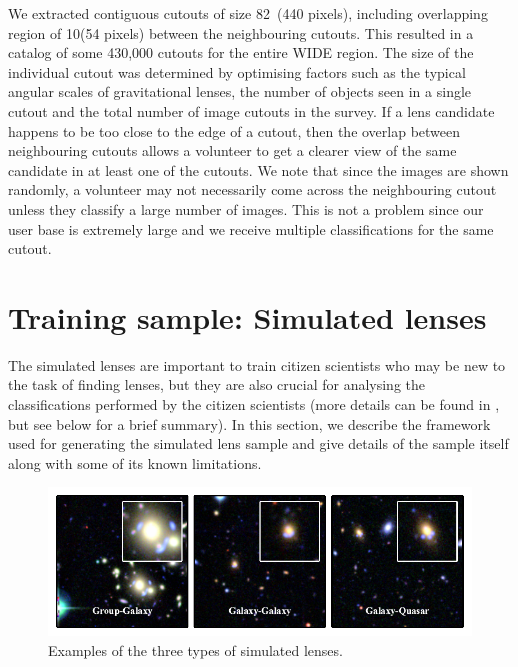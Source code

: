 \documentclass[useAMS,usenatbib,a4paper]{mn2e}
\begin{document}
We extracted contiguous cutouts of size 82\arcsec\ (440 pixels), including
overlapping region of 10\arcsec (54 pixels) between the neighbouring
cutouts. This resulted in a catalog of some 430,000 cutouts for the entire \cfhtls
WIDE region. The size of the individual cutout was determined by
optimising factors such as the typical angular scales of gravitational
lenses, the number of objects seen in a single cutout and the total
number of image cutouts in the survey. If a lens
candidate happens to be too close to the edge of a cutout, then the overlap
between neighbouring cutouts allows a volunteer to get a clearer view
of the same candidate in at least one of the cutouts. We note that since
the images are shown randomly, a volunteer may not necessarily come
across the neighbouring cutout unless they classify a large
number of images. This is not a problem since our user base is extremely
large and we receive multiple classifications for the same cutout.



\section{Training sample: Simulated lenses}
\label{sec:ts}

The simulated lenses are important to train citizen scientists who may be
new to the task of finding lenses, but they are also crucial for
analysing the classifications performed by the citizen scientists (more
details can be found in \PaperOne, but see  below for a brief
summary). In this section, we describe the framework used for generating the
simulated lens sample and give details of the sample itself along with
some of its known limitations.

\begin{figure}
\begin{center}
\includegraphics[scale=1.0]{sim_cgq.pdf}
\caption{ \label{fig:sim}
Examples of the three types of simulated lenses.
}
\end{center}
\end{figure}
\end{document}
